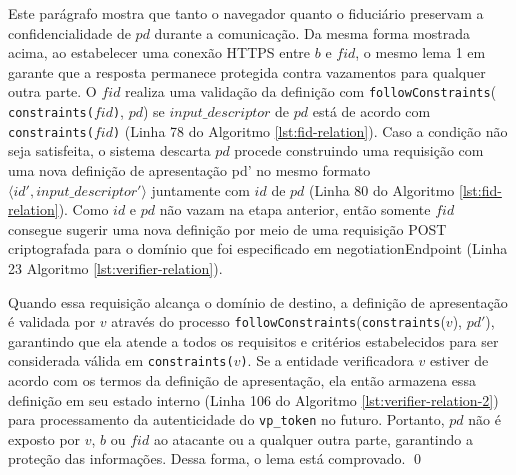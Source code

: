   Este parágrafo mostra que tanto o navegador quanto o fiduciário preservam a confidencialidade de $pd$ durante a comunicação. 
  Da mesma forma mostrada acima, ao estabelecer uma conexão HTTPS entre $b$ e $fid$, o mesmo lema 1 em \cite{fett2024wim} garante que a resposta permanece protegida contra vazamentos para qualquer outra parte.
  O $fid$ realiza uma validação da definição com \texttt{followConstraints}( \texttt{constraints($fid$)}, $pd$) se $input\_descriptor$ de $pd$ está de acordo com \texttt{constraints($fid$)} (Linha 78 do Algoritmo \ref{lst:fid-relation}).
  Caso a condição não seja satisfeita, o sistema descarta $pd$ procede construindo uma requisição com uma nova definição de apresentação pd' no mesmo formato $ \langle id', input\_descriptor'\rangle $ juntamente com $id$ de $pd$ (Linha 80 do Algoritmo \ref{lst:fid-relation}).
  Como $id$ e $pd$ não vazam na etapa anterior, então somente $fid$ consegue sugerir uma nova definição por meio de uma requisição POST criptografada para o domínio que foi especificado em negotiationEndpoint (Linha 23  Algoritmo \ref{lst:verifier-relation}).
  
  Quando essa requisição alcança o domínio de destino, a definição de apresentação é validada por $v$ através do processo \texttt{followConstraints}(\texttt{constraints}($v$), $pd'$), garantindo que ela atende a todos os requisitos e critérios estabelecidos para ser considerada válida em \texttt{constraints($v$)}. 
  Se a entidade verificadora $v$ estiver de acordo com os termos da definição de apresentação, ela então armazena essa definição em seu estado interno (Linha 106 do Algoritmo \ref{lst:verifier-relation-2}) para processamento da autenticidade do \texttt{vp\_token} no futuro.
  Portanto, $pd$ não é exposto por $v$, $b$ ou $fid$ ao atacante ou a qualquer outra parte, garantindo a proteção das informações. Dessa forma, o lema está comprovado. \qed

